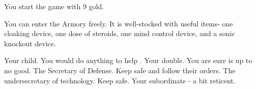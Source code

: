 \documentclass[char]{guildcamp3}
\begin{document}
\begin{itemz}[Notes]
	\item You start the game with 9 gold. 
	\item You can enter the Armory freely. It is well-stocked with useful items- one cloaking device, one dose of steroids, one mind control device, and a sonic knockout device.

\end{itemz}

\begin{contacts}
  \contact{\cSciOne{}} Your child. You would do anything to help \cSciOne{\them}. 
  \contact{\cRogueTwo{}} Your double. You are sure \cRogueTwo{\they} is up to no good. 
  \contact{\cPoliOne{}} The Secretary of Defense. Keep \cPoliOne{\them} safe and follow their orders.
  \contact{\cPoliTwo{}} The undersecretary of technology. Keep \cPoliTwo{\them} safe.
  \contact{\cSpecOpTwo{}} Your subordinate - a bit reticent.
\end{contacts}
\end{document}
